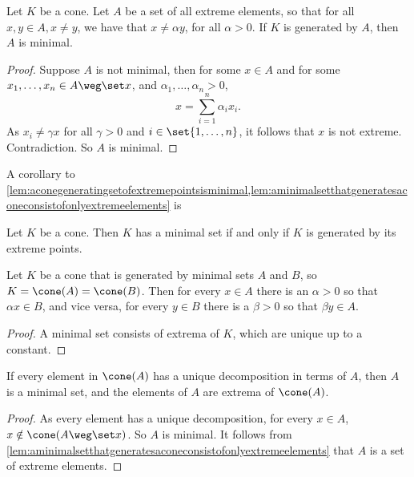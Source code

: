 \documentclass[12pt,a4paper]{article}
\begin{document}
\begin{lemma}\label{lem:aconegeneratingsetofextremepointsisminimal}
Let $K$ be a cone. Let $A$ be a set of all extreme elements, so that for all $x,y\in A, x\neq y$, we have that $x\neq \alpha y$, for all $\alpha>0$. If $K$ is generated by $A$, then $A$ is minimal. 
\end{lemma}
\begin{proof}
    Suppose $A$ is not minimal, then for some $x\in A$ and for some $x_1,\ldots,x_n\in A\weg\set x$, and $\alpha_1,\ldots,\alpha_n>0$, \[
    x = \sum_{i=1}^n\alpha_ix_i.
    \]
    As $x_i\neq \gamma x$ for all $\gamma>0$ and $i\in\set{1,\ldots,n}$, it follows that $x$ is not extreme. Contradiction. So $A$ is minimal. 
\end{proof}




A corollary to \cref{lem:aconegeneratingsetofextremepointsisminimal,lem:aminimalsetthatgeneratesaconeconsistofonlyextremeelements} is 
\begin{corollary}\label{cor:aconehasaminimalsetifandonlyifitisgeneratedbyitsextremeelements}
    Let $K$ be a cone. Then $K$ has a minimal set if and only if $K$ is generated by its extreme points. 
\end{corollary}

\begin{lemma}\label{lem:uniquenessofminimalsetthatgeneratescone}
    Let $K$ be a cone that is generated by minimal sets $A$ and $B$, so $K=\cone(A)=\cone(B)$. Then for every $x\in A$ there is an $\alpha>0$ so that $\alpha x\in B$, and vice versa, for every $y\in B$ there is a $\beta>0$ so that $\beta y \in A$. 
\end{lemma}
\begin{proof}
    A minimal set consists of extrema of $K$, which are unique up to a constant. 
\end{proof}

\begin{lemma}\label{lem:aconegeneratedbyAwithuniquedecompositionthenAisminimalandconsistofextremepoints}
    If every element in $\cone(A)$ has a unique decomposition in terms of $A$, then $A$ is a minimal set, and the elements of $A$ are extrema of $\cone(A)$.   
\end{lemma}
\begin{proof}
    As every element has a unique decomposition, for every $x\in A$, $x\notin \cone(A\weg\set x)$. So $A$ is minimal. It follows from \cref{lem:aminimalsetthatgeneratesaconeconsistofonlyextremeelements} that $A$ is a set of extreme elements. 
\end{proof}
\end{document}
